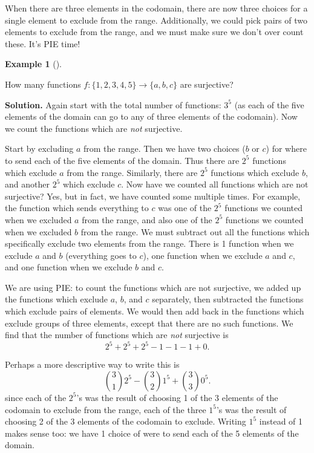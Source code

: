 \documentclass[10pt,]{book}
\theoremstyle{plain}
\theoremstyle{definition}
\newtheorem{example}[theorem]{Example}
\theoremstyle{definition}
\theoremstyle{definition}
\numberwithin{equation}{section}
\begin{document}
    When there are three elements in the codomain, there are now three choices for a single element to exclude from the range. Additionally, we could pick pairs of two elements to exclude from the range, and we must make sure we don't over count these. It's PIE time!
\begin{example}[]\label{example-53}

    How many functions \(f: \{1,2,3,4,5\} \to \{a,b,c\}\) are surjective?
\par\medskip\noindent%
\textbf{Solution.}\quad 
    Again start with the total number of functions: \(3^5\) (as each of the five elements of the domain can go to any of three elements of the codomain). Now we count the functions which are \emph{not} surjective.
\par

    Start by excluding \(a\) from the range. Then we have two choices (\(b\) or \(c\)) for where to send each of the five elements of the domain. Thus there are \(2^5\) functions which exclude \(a\) from the range. Similarly, there are \(2^5\) functions which exclude \(b\), and another \(2^5\) which exclude \(c\). Now have we counted all functions which are not surjective? Yes, but in fact, we have counted some multiple times. For example, the function which sends everything to \(c\) was one of the \(2^5\) functions we counted when we excluded \(a\) from the range, and also one of the \(2^5\) functions we counted when we excluded \(b\) from the range. We must subtract out all the functions which specifically exclude two elements from the range. There is 1 function when we exclude \(a\) and \(b\) (everything goes to \(c\)), one function when we exclude \(a\) and \(c\), and one function when we exclude \(b\) and \(c\).
\par

    We are using PIE: to count the functions which are not surjective, we added up the functions which exclude \(a\), \(b\), and \(c\) separately, then subtracted the functions which exclude pairs of elements. We would then add back in the functions which exclude groups of three elements, except that there are no such functions. We find that the number of functions which are \emph{not} surjective is
    \begin{equation*}
      2^5 + 2^5 + 2^5 - 1 - 1 - 1 + 0.
    \end{equation*}
\par

    Perhaps a more descriptive way to write this is
    \begin{equation*}
      {3 \choose 1}2^5 - {3 \choose 2}1^5 + {3 \choose 3}0^5.
    \end{equation*}
    since each of the \(2^5\)'s was the result of choosing 1 of the 3 elements of the codomain to exclude from the range, each of the three \(1^5\)'s was the result of choosing 2 of the 3 elements of the codomain to exclude. Writing \(1^5\) instead of 1 makes sense too: we have 1 choice of were to send each of the 5 elements of the domain.
\par


\end{example}
\end{document}
